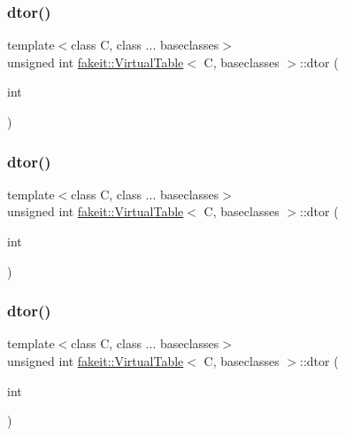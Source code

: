 \subsubsection{\texorpdfstring{dtor()}{dtor()}\hspace{0.1cm}{\footnotesize\ttfamily [1/10]}}
{\footnotesize\ttfamily template$<$class C, class ... baseclasses$>$ \\
unsigned int \mbox{\hyperlink{structfakeit_1_1VirtualTable}{fakeit\+::\+Virtual\+Table}}$<$ C, baseclasses $>$\+::dtor (\begin{DoxyParamCaption}\item[{int}]{ }\end{DoxyParamCaption})\hspace{0.3cm}{\ttfamily [inline]}}

\mbox{\label{structfakeit_1_1VirtualTable_a7be0619d713b6ae2cac5722895176a14}} 
\subsubsection{\texorpdfstring{dtor()}{dtor()}\hspace{0.1cm}{\footnotesize\ttfamily [2/10]}}
{\footnotesize\ttfamily template$<$class C, class ... baseclasses$>$ \\
unsigned int \mbox{\hyperlink{structfakeit_1_1VirtualTable}{fakeit\+::\+Virtual\+Table}}$<$ C, baseclasses $>$\+::dtor (\begin{DoxyParamCaption}\item[{int}]{ }\end{DoxyParamCaption})\hspace{0.3cm}{\ttfamily [inline]}}

\mbox{\label{structfakeit_1_1VirtualTable_a7be0619d713b6ae2cac5722895176a14}} 
\subsubsection{\texorpdfstring{dtor()}{dtor()}\hspace{0.1cm}{\footnotesize\ttfamily [3/10]}}
{\footnotesize\ttfamily template$<$class C, class ... baseclasses$>$ \\
unsigned int \mbox{\hyperlink{structfakeit_1_1VirtualTable}{fakeit\+::\+Virtual\+Table}}$<$ C, baseclasses $>$\+::dtor (\begin{DoxyParamCaption}\item[{int}]{ }\end{DoxyParamCaption})\hspace{0.3cm}{\ttfamily [inline]}}

